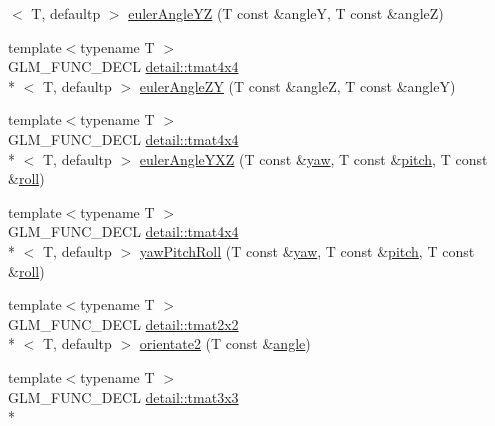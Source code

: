 \begin{DoxyCompactItemize}
$<$ T, defaultp $>$ \hyperlink{group__gtx__euler__angles_ga4bff0f8324770261d3a6ddadd790ec22}{euler\-Angle\-Y\-Z} (T const \&angle\-Y, T const \&angle\-Z)
\item 
{\footnotesize template$<$typename T $>$ }\\G\-L\-M\-\_\-\-F\-U\-N\-C\-\_\-\-D\-E\-C\-L \hyperlink{structglm_1_1detail_1_1tmat4x4}{detail\-::tmat4x4}\\*
$<$ T, defaultp $>$ \hyperlink{group__gtx__euler__angles_gaeabd76319f5a19188a0423769950df76}{euler\-Angle\-Z\-Y} (T const \&angle\-Z, T const \&angle\-Y)
\item 
{\footnotesize template$<$typename T $>$ }\\G\-L\-M\-\_\-\-F\-U\-N\-C\-\_\-\-D\-E\-C\-L \hyperlink{structglm_1_1detail_1_1tmat4x4}{detail\-::tmat4x4}\\*
$<$ T, defaultp $>$ \hyperlink{group__gtx__euler__angles_gab9bc80f4f579efd8f0d161e8b58ff452}{euler\-Angle\-Y\-X\-Z} (T const \&\hyperlink{group__gtc__quaternion_ga1de7653ddf380ff06d2300eea831664c}{yaw}, T const \&\hyperlink{group__gtc__quaternion_ga4d345dc369a54f53f5ebc375bac56d11}{pitch}, T const \&\hyperlink{group__gtc__quaternion_ga6d883e423bc425f4334fcce202131f7e}{roll})
\item 
{\footnotesize template$<$typename T $>$ }\\G\-L\-M\-\_\-\-F\-U\-N\-C\-\_\-\-D\-E\-C\-L \hyperlink{structglm_1_1detail_1_1tmat4x4}{detail\-::tmat4x4}\\*
$<$ T, defaultp $>$ \hyperlink{group__gtx__euler__angles_gaf6f927d06835272cd6a61ee3f8f65f5e}{yaw\-Pitch\-Roll} (T const \&\hyperlink{group__gtc__quaternion_ga1de7653ddf380ff06d2300eea831664c}{yaw}, T const \&\hyperlink{group__gtc__quaternion_ga4d345dc369a54f53f5ebc375bac56d11}{pitch}, T const \&\hyperlink{group__gtc__quaternion_ga6d883e423bc425f4334fcce202131f7e}{roll})
\item 
{\footnotesize template$<$typename T $>$ }\\G\-L\-M\-\_\-\-F\-U\-N\-C\-\_\-\-D\-E\-C\-L \hyperlink{structglm_1_1detail_1_1tmat2x2}{detail\-::tmat2x2}\\*
$<$ T, defaultp $>$ \hyperlink{group__gtx__euler__angles_gab39476f0decc117783e02ba389a04ee7}{orientate2} (T const \&\hyperlink{group__gtc__quaternion_ga23a3fc7ada5bbb665ff84c92c6e0542c}{angle})
\item 
{\footnotesize template$<$typename T $>$ }\\G\-L\-M\-\_\-\-F\-U\-N\-C\-\_\-\-D\-E\-C\-L \hyperlink{structglm_1_1detail_1_1tmat3x3}{detail\-::tmat3x3}\\*

\end{DoxyCompactItemize}
